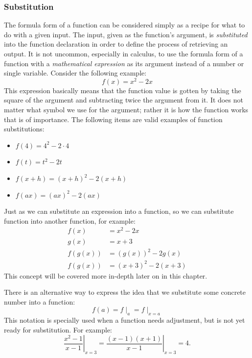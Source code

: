 \documentclass[11pt,oneside]{book}              %
\begin{document}
\subsubsection{Substitution}
The formula form of a function can be considered simply as a recipe for what to do with a given input. The input, given as the function's argument, is \textit{substituted} into the function declaration in order to define the process of retrieving an output. It is not uncommon, especially in calculus, to use the formula form of a function with a \textit{mathematical expression} as its argument instead of a number or single variable. Consider the following example:
\begin{equation*}
	f(x) = x^2 - 2x
\end{equation*}
This expression basically means that the function value is gotten by taking the square of the argument and subtracting twice the argument from it. It does not matter what symbol we use for the argument; rather it is how the function works that is of importance. The following items are valid examples of function substitutions:
\begin{itemize}
	\item $f(4) = 4^2 − 2 \cdot 4 $
	\item $f(t) = t^2 − 2t$
	\item $f(x + h) = (x+ h)^2 − 2 (x + h)$
	\item $f(a x) = (a x)^2 − 2 (a x)$
\end{itemize}

Just as we can substitute an expression into a function, so we can substitute function into another function, for example:
\begin{align}
	f(x) &= x^2 - 2x \\
	g(x) &= x + 3 \\
	f(g(x)) &= (g(x))^2 - 2g(x) \\
	f(g(x)) &= (x + 3)^2 - 2(x + 3)
\end{align}
This concept will be covered more in-depth later on in this chapter.

There is an alternative way to express the idea that we substitute some concrete number into a function:
\begin{equation*}
f(a) = f \mid_a = f\mid_{x=a}
\end{equation*}
This notation is specially used when a function needs adjustment, but is not yet ready for substitution. For example:
\begin{equation*}
\left.\frac{x^2 - 1}{x-1}\right\rvert_{x=3} = \left.\frac{(x-1)(x+1)}{x-1}\right\rvert_{x=3} = 4.
\end{equation*}
\end{document}
